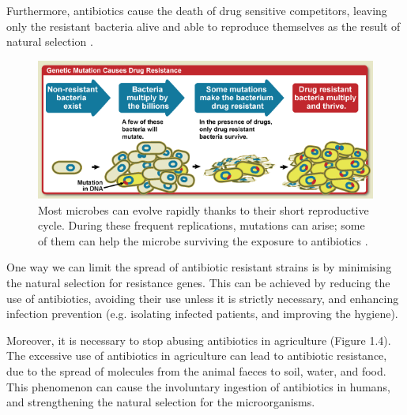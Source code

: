 \documentclass[11pt]{report}
\begin{document}
\clearpage
Furthermore, antibiotics cause the death of drug sensitive competitors, leaving only the resistant bacteria alive and able to reproduce themselves as the result of natural selection \cite{doi:10.1093/emph/eou024}.

\begin{figure}[htp]
\centering
\includegraphics[scale=0.57]{img/Bacteria_Resistance.png}
\caption{Most microbes can evolve rapidly thanks to their short reproductive cycle. During these frequent replications, mutations can arise; some of them can help the microbe surviving the exposure to antibiotics \cite{NHI_DrugResistance}.}
\label{}
\end{figure}

One way we can limit the spread of antibiotic resistant strains is by minimising the natural selection for resistance genes.
This can be achieved by reducing the use of antibiotics, avoiding their use unless it is strictly necessary, and enhancing infection prevention (e.g. isolating infected patients, and improving the hygiene).

Moreover, it is necessary to stop abusing antibiotics in agriculture \cite{Spellberg2014} \cite{doi:10.1093/emph/eou024} (Figure 1.4).
The excessive use of antibiotics in agriculture can lead to antibiotic resistance, due to the spread of molecules from the animal faeces to soil, water, and food. This phenomenon can cause the  involuntary ingestion of antibiotics in humans, and strengthening the natural selection for the microorganisms.
\end{document}

